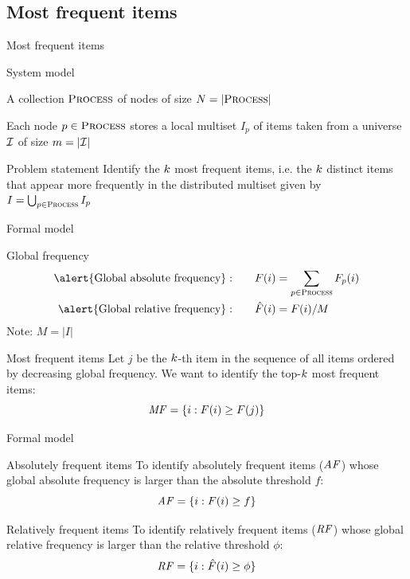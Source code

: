 \subsection{Most frequent items}

\begin{frame}{Most frequent items}

\begin{block}{System model}

\BI
\item A collection $\textsc{Process}$ of nodes of size $N=|\textsc{Process}|$
\item Each node $p \in \textsc{Process}$ stores a local multiset $I_p$ of items taken
from a universe $\cal I$ of size $m=|\cal I|$
\EI
\end{block}

\begin{block}{Problem statement}
Identify the $k$ \alert{most frequent items}, i.e. the $k$ distinct items
that appear more frequently in the distributed multiset given by 
$I = \bigcup_{p \in \textsc{Process}} I_p$
\end{block}

\begin{Bib}
\end{Bib}

\end{frame}


\begin{frame}{Formal model}

\begin{block}{Global frequency}
\begin{align*}
\textrm{\alert{Global absolute frequency}}: \qquad& \F(i) = \sum_{p \in \Process} \F_p(i) \\
\textrm{\alert{Global relative frequency}}: \qquad& \FR(i) = \F(i)/\M
\end{align*}
Note: $M = |I|$
\end{block}

\begin{block}{Most frequent items}
Let $j$ be the $k$-th item in the sequence of all items ordered by decreasing
global frequency. We want to identify the top-$k$ most frequent items:
\[
  \mathit{MF} = \{ i : F(i) \geq F(j) \}
\]
\end{block}


\end{frame}

\begin{frame}{Formal model}

\begin{block}{Absolutely frequent items}
To identify \alert{absolutely frequent} items ($\mathit{AF}$) whose
global absolute frequency is larger than the absolute threshold $f$:
\[
  \mathit{AF} = \{ i : F(i) \geq f \}
\]
\end{block}

\medskip
\begin{block}{Relatively frequent items}
To identify \alert{relatively frequent} items ($\mathit{RF}$) whose
global relative frequency is larger than the relative threshold $\phi$:
\[
  \mathit{RF} = \{ i : \hat{F}(i) \geq \phi \}
\]
\end{block}

\end{frame}

